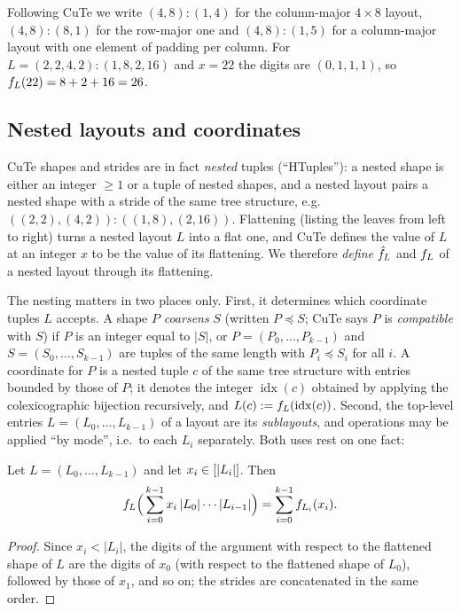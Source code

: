 \begin{example}\label{ex:running}
Following CuTe we write $(4,8):(1,4)$ for the column-major $4\times 8$ layout,
$(4,8):(8,1)$ for the row-major one and $(4,8):(1,5)$ for a column-major layout with one element of
padding per column. For $L=(2,2,4,2):(1,8,2,16)$ and $x=22$ the digits are $(0,1,1,1)$, so
$f_{L}(22)=8+2+16=26$.
\end{example}

\subsection{Nested layouts and coordinates}\label{sec:nested}

CuTe shapes and strides are in fact \emph{nested} tuples (``HTuples''): a nested shape is either
an integer $\ge1$ or a tuple of nested shapes, and a nested layout pairs a nested shape with a
stride of the same tree structure, e.g.\ $((2,2),(4,2)):((1,8),(2,16))$. Flattening (listing the
leaves from left to right) turns a nested layout $L$ into a flat one, and CuTe defines the value of
$L$ at an integer $x$ to be the value of its flattening. We therefore \emph{define}
$\hat{f}_{L}$ and $f_{L}$ of a nested layout through its flattening.

The nesting matters in two places only. First, it determines which coordinate tuples $L$ accepts.
A shape $P$ \emph{coarsens} $S$ (written $P\preceq S$; CuTe says $P$ is \emph{compatible} with $S$)
if $P$ is an integer equal to $|S|$, or $P=(P_0,\dots,P_{k-1})$ and $S=(S_0,\dots,S_{k-1})$ are
tuples of the same length with $P_i\preceq S_i$ for all $i$. A coordinate for $P$ is a nested tuple
$c$ of the same tree structure with entries bounded by those of $P$; it denotes the integer
$\operatorname{idx}(c)$ obtained by applying the colexicographic bijection recursively, and
$L(c):=f_{L}(\operatorname{idx}(c))$. Second, the top-level entries
$L=(L_0,\dots,L_{k-1})$ of a layout are its \emph{sublayouts}, and operations may be applied ``by
mode'', i.e.\ to each $L_i$ separately. Both uses rest on one fact:

\begin{proposition}\label{prop:concat}
Let $L=(L_0,\dots,L_{k-1})$ and let $x_i\in[|L_i|]$. Then
\[ f_{L}\Bigl(\,\sum_{i=0}^{k-1}x_i\,|L_0|\cdots|L_{i-1}|\Bigr)=\sum_{i=0}^{k-1}f_{L_i}(x_i). \]
\end{proposition}
\begin{proof}
Since $x_i<|L_i|$, the digits of the argument with respect to the flattened shape of $L$ are the
digits of $x_0$ (with respect to the flattened shape of $L_0$), followed by those of $x_1$, and so
on; the strides are concatenated in the same order.
\end{proof}


